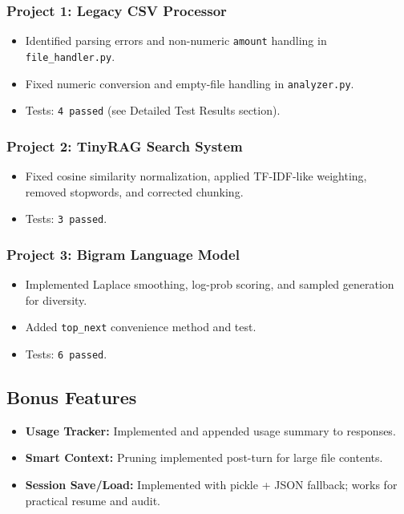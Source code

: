 \documentclass[12pt, a4paper]{article}
\begin{document}
\subsubsection*{Project 1: Legacy CSV Processor}
\begin{itemize}
  \item Identified parsing errors and non-numeric \texttt{amount} handling in \texttt{file\_handler.py}.
  \item Fixed numeric conversion and empty-file handling in \texttt{analyzer.py}.
  \item Tests: \texttt{4 passed} (see Detailed Test Results section).
\end{itemize}

\subsubsection*{Project 2: TinyRAG Search System}
\begin{itemize}
  \item Fixed cosine similarity normalization, applied TF-IDF-like weighting, removed stopwords, and corrected chunking.
  \item Tests: \texttt{3 passed}.
\end{itemize}

\subsubsection*{Project 3: Bigram Language Model}
\begin{itemize}
  \item Implemented Laplace smoothing, log-prob scoring, and sampled generation for diversity.
  \item Added \texttt{top\_next} convenience method and test.
  \item Tests: \texttt{6 passed}.
\end{itemize}

\subsection{Bonus Features}
\begin{itemize}
  \item \textbf{Usage Tracker:} Implemented and appended usage summary to responses.
  \item \textbf{Smart Context:} Pruning implemented post-turn for large file contents.
  \item \textbf{Session Save/Load:} Implemented with pickle + JSON fallback; works for practical resume and audit.
\end{itemize}
\end{document}

